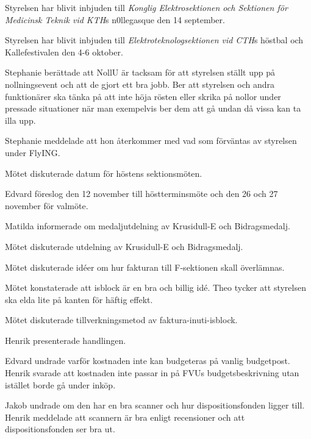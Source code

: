 \documentclass[10pt]{article}
\begin{document}
\begin{paragrafer}
\begin{paragrafer}
Styrelsen har blivit inbjuden till \textit{Konglig Elektrosektionen och Sektionen för Medicinsk Teknik vid KTH}s n0llegasque den 14 september. 

Styrelsen har blivit inbjuden till \textit{Elektroteknologsektionen vid CTH}s höstbal och Kallefestivalen den 4-6 oktober.


\end{paragrafer}


Stephanie berättade att NollU är tacksam för att styrelsen ställt upp på nollningsevent och att de gjort ett bra jobb. 
Ber att styrelsen och andra funktionärer ska tänka på att inte höja rösten eller skrika på nollor under pressade situationer när man exempelvis ber dem att gå undan då vissa kan ta illa upp.

Stephanie meddelade att hon återkommer med vad som förväntas av styrelsen under FlyING. 


Mötet diskuterade datum för höstens sektionsmöten. 

Edvard föreslog den 12 november till höstterminsmöte och den 26 och 27 november för valmöte.  

Matilda informerade om medaljutdelning av Krusidull-E och Bidragsmedalj.

Mötet diskuterade utdelning av Krusidull-E och Bidragsmedalj.

Mötet diskuterade idéer om hur fakturan till F-sektionen skall överlämnas. 

Mötet konstaterade att isblock är en bra och billig idé. Theo tycker att styrelsen ska elda lite på kanten för häftig effekt. 

Mötet diskuterade tillverkningsmetod av faktura-inuti-isblock. 

Henrik presenterade handlingen. 

Edvard undrade varför kostnaden inte kan budgeteras på vanlig budgetpost. 
Henrik svarade att kostnaden inte passar in på FVUs budgetsbeskrivning utan istället borde gå under inköp.

Jakob undrade om den har en bra scanner och hur dispositionsfonden ligger till. Henrik meddelade att scannern är bra enligt recensioner och att dispositionsfonden ser bra ut. 

\Mbabay


\end{paragrafer}
\end{document}
